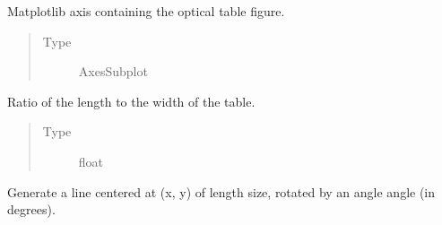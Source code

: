 \documentclass[letterpaper,10pt,english]{sphinxmanual}
\begin{document}
\begin{fulllineitems}
\begin{quote}
\begin{description}
\end{description}\end{quote}

\begin{fulllineitems}
\label{\detokenize{index:pyopticaltable.OpticalTable.ax}}
\sphinxAtStartPar
Matplotlib axis containing the optical table figure.
\begin{quote}\begin{description}
\item[{Type}] \leavevmode
\sphinxAtStartPar
AxesSubplot

\end{description}\end{quote}

\end{fulllineitems}


\begin{fulllineitems}
\label{\detokenize{index:pyopticaltable.OpticalTable.aspect_ratio}}
\sphinxAtStartPar
Ratio of the length to the width of the table.
\begin{quote}\begin{description}
\item[{Type}] \leavevmode
\sphinxAtStartPar
float

\end{description}\end{quote}

\end{fulllineitems}


\begin{fulllineitems}
\label{\detokenize{index:pyopticaltable.OpticalTable.angled_line}}
\sphinxAtStartPar
Generate a line centered at (x, y) of length size, rotated by an angle
angle (in degrees).


\end{fulllineitems}
\end{fulllineitems}
\end{document}
